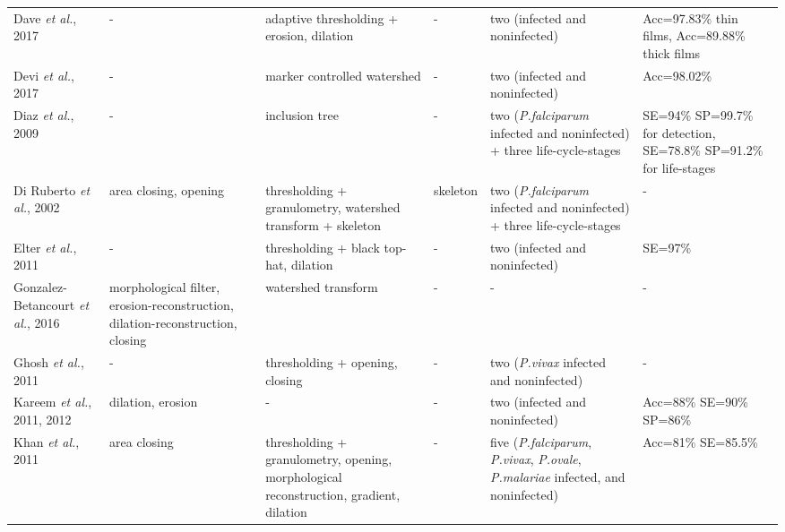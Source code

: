 \begin{longtable}{C{2.1cm} C{2.1cm} C{2.3cm} H C{2.7cm} C{2.2cm} }
    Dave \emph{et al.}, 2017 &
		- &
		adaptive thresholding + erosion, dilation &	
		- &
		two (infected and noninfected) &
		Acc=97.83\% thin films, Acc=89.88\% thick films
		\vspace{0.6cm}
        \\

    Devi \emph{et al.}, 2017 &
		- &
		marker controlled watershed &	
		- &
		two (infected and noninfected)  &
		Acc=98.02\%
		\vspace{0.6cm}
        \\

    Diaz \emph{et al.}, 2009 &
		- &
		inclusion tree &	
		- &
		two (\emph{P.falciparum} infected and noninfected) + three life-cycle-stages &
		SE=94\% SP=99.7\% for detection, SE=78.8\% SP=91.2\% for life-stages
\vspace{0.6cm}
		\\

    Di Ruberto \emph{et al.}, 2002 &
		area closing, opening &
		thresholding + granulometry, watershed  transform + skeleton &	
		skeleton &
		two (\emph{P.falciparum} infected and noninfected) + three life-cycle-stages &
		-
\vspace{0.6cm}
		\\

    Elter \emph{et al.}, 2011 &
		- &
		thresholding + black top-hat, dilation &	
		- &
		two (infected and noninfected) &
		SE=97\%
		\vspace{0.6cm} \\

    Gonzalez-Betancourt \emph{et al.}, 2016  &
    	morphological filter, erosion-reconstruction, dilation-reconstruction, closing &
    	watershed  transform  &
    	- &
    	- &
    	- \vspace{0.6cm} \\	

    Ghosh \emph{et al.}, 2011  &
    	- &
    	thresholding + opening, closing  &
    	- &
    	two (\emph{P.vivax} infected and noninfected) &
    	- \vspace{0.6cm} \\

    Kareem \emph{et al.}, 2011, 2012  &
    	dilation, erosion &
    	-  &
    	- &
    	two (infected and noninfected) &
    	Acc=88\% SE=90\% SP=86\% \vspace{0.6cm} \\	

    Khan \emph{et al.}, 2011  &
    	area closing &
    	thresholding + granulometry, opening, morphological reconstruction, gradient, dilation &
    	- &
    	five (\emph{P.falciparum}, \emph{P.vivax}, \emph{P.ovale}, \emph{P.malariae} infected, and noninfected) &
    	Acc=81\% SE=85.5\% \vspace{0.6cm} \\	


\end{longtable}
